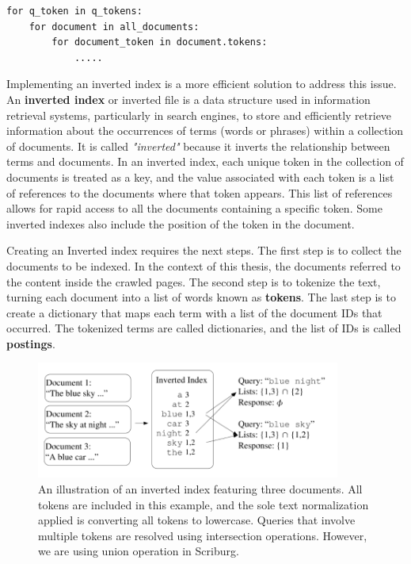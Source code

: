 \lstset{language=python}
{\footnotesize
\begin{lstlisting}[frame=single, caption={A naive way of finding a query match in all the documents.},captionpos=b, label={lst:nested-loops}]
for q_token in q_tokens:
    for document in all_documents:
        for document_token in document.tokens:
            .....
\end{lstlisting}}

 Implementing an inverted index is a more efficient solution to address this issue. An \textbf{inverted index} or inverted file is a data structure used in information retrieval systems, particularly in search engines, to store and efficiently retrieve information about the occurrences of terms (words or phrases) within a collection of documents. It is called \textit{"inverted"} because it inverts the relationship between terms and documents.
In an inverted index, each unique token in the collection of documents is treated as a key, and the value associated with each token is a list of references to the documents where that token appears. This list of references allows for rapid access to all the documents containing a specific token. Some inverted indexes also include the position of the token in the document. 

Creating an Inverted index requires the next steps. The first step is to collect the documents to be indexed. In the context of this thesis, the documents referred to the content inside the crawled pages. The second step is to tokenize the text, turning each document into a list of words known as \textbf{tokens}. The last step is to create a dictionary that maps each term with a list of the document IDs that occurred. The tokenized terms are called dictionaries, and the list of IDs is called \textbf{postings}. 

\begin{figure}[ht]	
     \centering
     \includegraphics[width=10cm]{figures/inverted_index.png}
     \caption{
An illustration of an inverted index featuring three documents. All tokens are included in this example, and the sole text normalization applied is converting all tokens to lowercase. Queries that involve multiple tokens are resolved using intersection operations. However, we are using union operation in Scriburg. \cite{castillo2005effective}}
     \label{fig:inverted-index-docs}
\end{figure}

